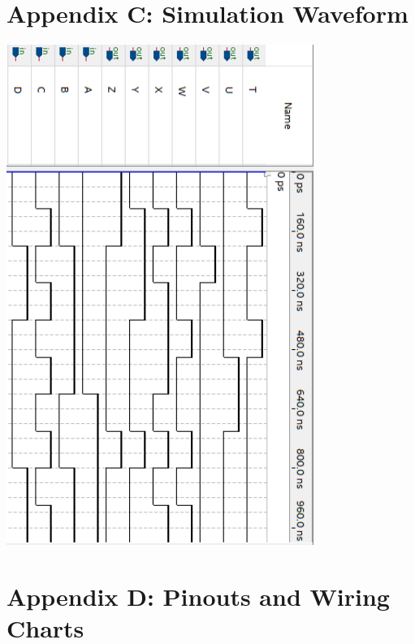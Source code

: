 \documentclass[12pt,letterpaper,titlepage]{article}
\begin{document}
\begin{raggedright}
\section{Appendix C: Simulation Waveform}
\begin{center}
\includegraphics[width=0.75\textwidth]{wave}
\end{center}
\clearpage

\section{Appendix D: Pinouts and Wiring Charts}

\vspace{5cm}


\end{raggedright}
\end{document}
